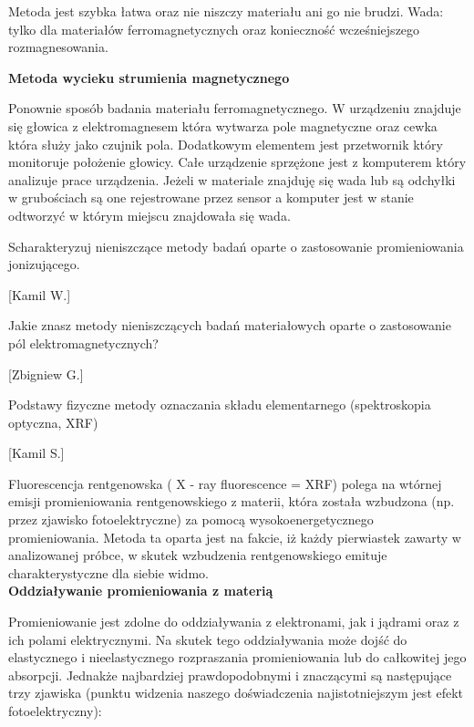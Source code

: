 \documentclass{article}
\begin{document}
\begin{enumerate}
Metoda jest szybka łatwa oraz nie niszczy materiału ani go nie brudzi.
Wada: tylko dla materiałów ferromagnetycznych oraz konieczność wcześniejszego rozmagnesowania. 


{\bf Metoda wycieku strumienia magnetycznego }


Ponownie sposób badania materiału ferromagnetycznego. W urządzeniu znajduje się głowica z elektromagnesem która wytwarza pole magnetyczne oraz cewka która służy jako czujnik pola. Dodatkowym elementem jest przetwornik który monitoruje położenie głowicy. Całe urządzenie sprzężone jest z komputerem który analizuje prace urządzenia. Jeżeli w materiale znajduję się wada lub są odchyłki w grubościach są one rejestrowane przez sensor a komputer jest w stanie odtworzyć w którym miejscu znajdowała się wada. 








{\Large \bf  \item Scharakteryzuj nieniszczące metody badań oparte o zastosowanie promieniowania
jonizującego.} [Kamil W.]

{\Large \bf  \item Jakie znasz metody nieniszczących badań materiałowych oparte o zastosowanie
pól elektromagnetycznych?} [Zbigniew G.]

{\Large \bf  \item Podstawy fizyczne metody oznaczania składu elementarnego (spektroskopia
optyczna, XRF)} [Kamil S.]



Fluorescencja rentgenowska ( X - ray fluorescence = XRF) polega na wtórnej emisji promieniowania rentgenowskiego z materii, która została wzbudzona (np. przez zjawisko fotoelektryczne) za pomocą wysokoenergetycznego promieniowania. Metoda ta oparta jest na fakcie, iż każdy pierwiastek zawarty w analizowanej próbce, w skutek wzbudzenia rentgenowskiego emituje charakterystyczne dla siebie widmo.\\

{\bf Oddziaływanie promieniowania z materią}

Promieniowanie jest zdolne do oddziaływania z elektronami, jak i jądrami oraz z ich polami elektrycznymi. Na skutek tego oddziaływania może dojść do elastycznego i nieelastycznego rozpraszania promieniowania lub do całkowitej jego absorpcji. Jednakże najbardziej prawdopodobnymi i znaczącymi są następujące trzy zjawiska (punktu widzenia naszego doświadczenia najistotniejszym jest efekt fotoelektryczny):\\


\end{enumerate}
\end{document}
